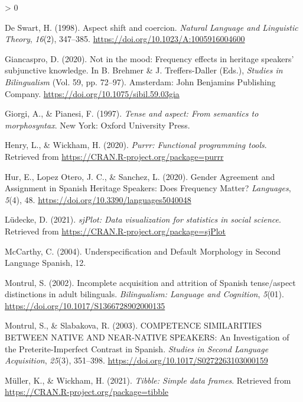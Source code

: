\documentclass[
  english,
  man]{apa6}
\newlength{\cslhangindent}
\newenvironment{CSLReferences}[2] %
 {%
  \setlength{\parindent}{0pt}
  \ifodd #1 \everypar{\setlength{\hangindent}{\cslhangindent}}\ignorespaces\fi
  \ifnum #2 > 0
  \setlength{\parskip}{#2\baselineskip}
  \fi
 }%
 {}
\begin{document}
\begin{CSLReferences}{1}{0}
\leavevmode\hypertarget{ref-de_swart_aspect_1998}{}%
De Swart, H. (1998). Aspect shift and coercion. \emph{Natural Language and Linguistic Theory}, \emph{16}(2), 347--385. \url{https://doi.org/10.1023/A:1005916004600}

\leavevmode\hypertarget{ref-brehmer_not_2020}{}%
Giancaspro, D. (2020). Not in the mood: {Frequency} effects in heritage speakers' subjunctive knowledge. In B. Brehmer \& J. Treffers-Daller (Eds.), \emph{Studies in {Bilingualism}} (Vol. 59, pp. 72--97). Amsterdam: John Benjamins Publishing Company. \url{https://doi.org/10.1075/sibil.59.03gia}

\leavevmode\hypertarget{ref-giorgi_tense_1997}{}%
Giorgi, A., \& Pianesi, F. (1997). \emph{Tense and aspect: From semantics to morphosyntax}. New York: Oxford University Press.

\leavevmode\hypertarget{ref-R-purrr}{}%
Henry, L., \& Wickham, H. (2020). \emph{Purrr: Functional programming tools}. Retrieved from \url{https://CRAN.R-project.org/package=purrr}

\leavevmode\hypertarget{ref-hur_gender_2020}{}%
Hur, E., Lopez Otero, J. C., \& Sanchez, L. (2020). Gender {Agreement} and {Assignment} in {Spanish} {Heritage} {Speakers}: {Does} {Frequency} {Matter}? \emph{Languages}, \emph{5}(4), 48. \url{https://doi.org/10.3390/languages5040048}

\leavevmode\hypertarget{ref-R-sjPlot}{}%
Lüdecke, D. (2021). \emph{sjPlot: Data visualization for statistics in social science}. Retrieved from \url{https://CRAN.R-project.org/package=sjPlot}

\leavevmode\hypertarget{ref-mccarthy_underspecification_2004}{}%
McCarthy, C. (2004). Underspecification and {Default} {Morphology} in {Second} {Language} {Spanish}, 12.

\leavevmode\hypertarget{ref-montrul_incomplete_2002}{}%
Montrul, S. (2002). Incomplete acquisition and attrition of {Spanish} tense/aspect distinctions in adult bilinguals. \emph{Bilingualism: Language and Cognition}, \emph{5}(01). \url{https://doi.org/10.1017/S1366728902000135}

\leavevmode\hypertarget{ref-montrul_competence_2003}{}%
Montrul, S., \& Slabakova, R. (2003). {COMPETENCE} {SIMILARITIES} {BETWEEN} {NATIVE} {AND} {NEAR}-{NATIVE} {SPEAKERS}: {An} {Investigation} of the {Preterite}-{Imperfect} {Contrast} in {Spanish}. \emph{Studies in Second Language Acquisition}, \emph{25}(3), 351--398. \url{https://doi.org/10.1017/S0272263103000159}

\leavevmode\hypertarget{ref-R-tibble}{}%
Müller, K., \& Wickham, H. (2021). \emph{Tibble: Simple data frames}. Retrieved from \url{https://CRAN.R-project.org/package=tibble}


\end{CSLReferences}
\end{document}
